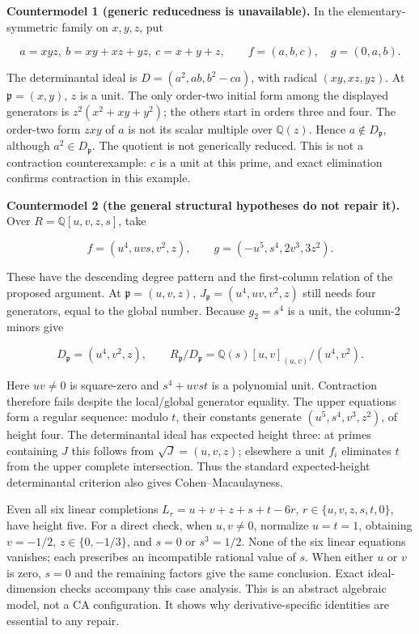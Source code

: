\documentclass[
  british,
  10pt,
]{article}
\begin{document}
\textbf{Countermodel 1 (generic reducedness is unavailable).} In the
elementary-symmetric family on \(x,y,z\), put

\[
 a=xyz,\ b=xy+xz+yz,\ c=x+y+z,\qquad
 f=(a,b,c),\quad g=(0,a,b).
\]

The determinantal ideal is \(D=(a^2,ab,b^2-ca)\), with radical
\((xy,xz,yz)\). At \(\mathfrak p=(x,y)\), \(z\) is a unit. The only
order-two initial form among the displayed generators is
\(z^2(x^2+xy+y^2)\); the others start in orders three and four. The
order-two form \(zxy\) of \(a\) is not its scalar multiple over
\(\mathbb Q(z)\). Hence \(a\notin D_{\mathfrak p}\), although
\(a^2\in D_{\mathfrak p}\). The quotient is not generically reduced.
This is not a contraction counterexample: \(c\) is a unit at this prime,
and exact elimination confirms contraction in this example.

\textbf{Countermodel 2 (the general structural hypotheses do not repair
it).} Over \(R=\mathbb Q[u,v,z,s]\), take

\[
 f=(u^4,uvs,v^2,z),\qquad g=(-u^5,s^4,2v^3,3z^2).
\]

These have the descending degree pattern and the first-column relation
of the proposed argument. At \(\mathfrak p=(u,v,z)\),
\(J_{\mathfrak p}=(u^4,uv,v^2,z)\) still needs four generators, equal to
the global number. Because \(g_2=s^4\) is a unit, the column-2 minors
give

\[
 D_{\mathfrak p}=(u^4,v^2,z),\qquad
 R_{\mathfrak p}/D_{\mathfrak p}
 =\mathbb Q(s)[u,v]_{(u,v)}/(u^4,v^2).
\]

Here \(uv\ne0\) is square-zero and \(s^4+uvst\) is a polynomial unit.
Contraction therefore fails despite the local/global generator equality.
The upper equations form a regular sequence: modulo \(t\), their
constants generate \((u^5,s^4,v^3,z^2)\), of height four. The
determinantal ideal has expected height three: at primes containing
\(J\) this follows from \(\sqrt J=(u,v,z)\); elsewhere a unit \(f_i\)
eliminates \(t\) from the upper complete intersection. Thus the standard
expected-height determinantal criterion also gives Cohen--Macaulayness.

Even all six linear completions \(L_r=u+v+z+s+t-6r\),
\(r\in\{u,v,z,s,t,0\}\), have height five. For a direct check, when
\(u,v\ne0\), normalize \(u=t=1\), obtaining \(v=-1/2\),
\(z\in\{0,-1/3\}\), and \(s=0\) or \(s^3=1/2\). None of the six linear
equations vanishes; each prescribes an incompatible rational value of
\(s\). When either \(u\) or \(v\) is zero, \(s=0\) and the remaining
factors give the same conclusion. Exact ideal-dimension checks accompany
this case analysis. This is an abstract algebraic model, not a CA
configuration. It shows why derivative-specific identities are essential
to any repair.
\end{document}
